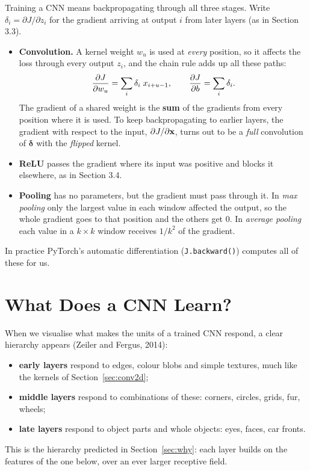 \documentclass[12pt, a4paper]{article}
\providecommand{\bdelta}{\boldsymbol{\delta}}
\begin{document}
Training a CNN means backpropagating through all three stages. Write
$\delta_i = \partial J / \partial z_i$ for the gradient arriving at output $i$
from later layers (as in Section 3.3).
\begin{itemize}
  \item \textbf{Convolution.} A kernel weight $w_u$ is used at \emph{every}
        position, so it affects the loss through every output $z_i$, and the
        chain rule adds up all these paths:
        \[
          \dfrac{\partial J}{\partial w_u} = \sum_{i} \delta_i\; x_{i+u-1},
          \qquad
          \dfrac{\partial J}{\partial b} = \sum_{i} \delta_i .
        \]
        The gradient of a shared weight is the \textbf{sum} of the gradients
        from every position where it is used. To keep backpropagating to
        earlier layers, the gradient with respect to the input,
        $\partial J / \partial \mathbf{x}$, turns out to be a \emph{full}
        convolution of $\bdelta$ with the \emph{flipped} kernel.
  \item \textbf{ReLU} passes the gradient where its input was positive and
        blocks it elsewhere, as in Section 3.4.
  \item \textbf{Pooling} has no parameters, but the gradient must pass through
        it. In \emph{max pooling} only the largest value in each window
        affected the output, so the whole gradient goes to that position and
        the others get $0$. In \emph{average pooling} each value in a
        $k \times k$ window receives $1/k^2$ of the gradient.
\end{itemize}
In practice PyTorch's automatic differentiation (\texttt{J.backward()})
computes all of these for us.

\section{What Does a CNN Learn?}

When we visualise what makes the units of a trained CNN respond, a clear
hierarchy appears (Zeiler and Fergus, 2014):
\begin{itemize}[nosep]
  \item \textbf{early layers} respond to edges, colour blobs and simple
        textures, much like the kernels of Section~\ref{sec:conv2d};
  \item \textbf{middle layers} respond to combinations of these: corners,
        circles, grids, fur, wheels;
  \item \textbf{late layers} respond to object parts and whole objects: eyes,
        faces, car fronts.
\end{itemize}
This is the hierarchy predicted in Section~\ref{sec:why}: each layer builds on
the features of the one below, over an ever larger receptive field.
\end{document}
